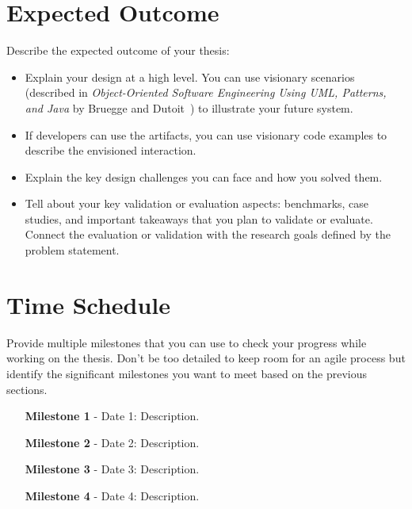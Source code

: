 \section*{Expected Outcome}

\begin{tcolorbox}[breakable]
	Describe the expected outcome of your thesis:
	\begin{itemize}
		\item Explain your design at a high level. You can use visionary scenarios (described in \textit{Object-Oriented Software Engineering Using UML, Patterns, and Java} by Bruegge and Dutoit~\cite{bruegge2013object}) to illustrate your future system.
		\item If developers can use the artifacts, you can use visionary code examples to describe the envisioned interaction.
		\item Explain the key design challenges you can face and how you solved them.
		\item Tell about your key validation or evaluation aspects: benchmarks, case studies, and important takeaways that you plan to validate or evaluate. Connect the evaluation or validation with the research goals defined by the problem statement.
	\end{itemize}
\end{tcolorbox}

\section*{Time Schedule}

\begin{tcolorbox}[breakable]
	Provide multiple milestones that you can use to check your progress while working on the thesis.
	Don't be too detailed to keep room for an agile process but identify the significant milestones you want to meet based on the previous sections.
\end{tcolorbox}

\begin{itemize}[itemindent=-13pt, leftmargin=43pt, align=left]
    \item[\textbf{Milestone 1} - Date 1:] Description.
    \item[\textbf{Milestone 2} - Date 2:] Description.
    \item[\textbf{Milestone 3} - Date 3:] Description.
    \item[\textbf{Milestone 4} - Date 4:] Description.
\end{itemize}


\backmatter









